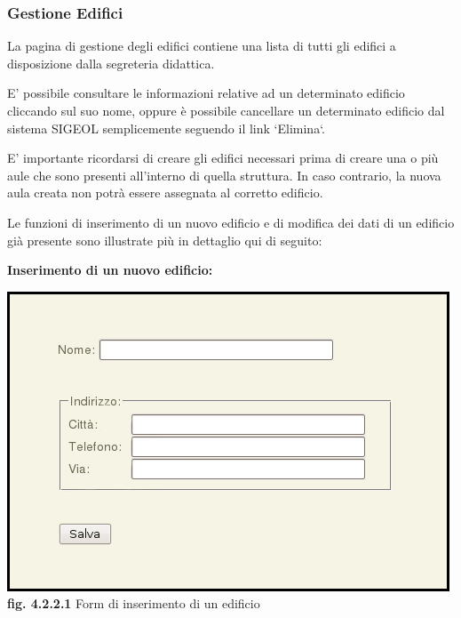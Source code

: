 \documentclass[11pt,a4paper]{article}
\begin{document}
\subsubsection{Gestione Edifici}
La pagina di gestione degli edifici contiene una lista di tutti gli edifici a disposizione dalla segreteria didattica.

E' possibile consultare le informazioni relative ad un determinato edificio cliccando sul suo nome, oppure è possibile cancellare un determinato edificio dal sistema SIGEOL semplicemente seguendo il link `Elimina`.

E' importante ricordarsi di creare gli edifici necessari prima di creare una o più aule che sono presenti all'interno di quella struttura. In caso contrario, la nuova aula creata non potrà essere assegnata al corretto edificio.

Le funzioni di inserimento di un nuovo edificio e di modifica dei dati di un edificio già presente sono illustrate più in dettaglio qui di seguito:
\newline \newline
\begin{large}\textbf{Inserimento di un nuovo edificio:}\end{large}

\begin{center}
	\includegraphics[scale=0.5]{images/nuovo_edificio.jpg}\\
	\textbf{fig. 4.2.2.1} Form di inserimento di un edificio\\
\end{center}
\end{document}
